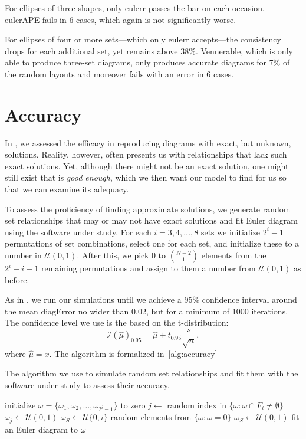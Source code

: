 \documentclass[
  oneside,
  openany,
  numbers=noendperiod,
  parskip=half,
  bibliography=totoc
]{scrbook}\usepackage[]{graphicx}\usepackage{xcolor}
\newcommand{\pkg}[1]{{\fontseries{b}\selectfont #1}}
\begin{document}
For ellipses of three shapes, only \pkg{eulerr} passes the bar on each
occasion. \pkg{eulerAPE} fails in
6
cases, which again is not significantly worse.

For ellipses of four or more sets---which only \pkg{eulerr} accepts---the
consistency drops for each additional set, yet remains above
38\%. \pkg{Vennerable}, which
is only able to produce three-set diagrams, only produces accurate diagrams for
7\% of the random layouts and moreover
fails with an error in 6 cases.

\section{Accuracy}
\label{sec:accuracy}

In , we assessed the efficacy in reproducing diagrams
with exact, but unknown, solutions. Reality, however, often presents us with
relationships that lack such exact solutions. Yet, although there might not be an
exact solution, one might still exist that is \emph{good enough},
which we then want our model to find for us so that we can examine
its adequacy.

To assess the proficiency of finding approximate solutions,
we generate random set relationships that may or may not have
exact solutions and fit Euler diagram using the software under study. For each
$i=3,4,\dots,8$ sets we initialize $2^i-1$ permutations of set combinations,
select one for each set, and initialize these to a number in
$\mathcal{U}(0, 1)$. After this, we pick $0 \text{ to } \binom{N-2}{1}$ elements
from the $2^i-i-1$ remaining permutations and assign to them a number from
$\mathcal{U}(0, 1)$ as before.

As in , we run our simulations until we achieve
a 95\% confidence interval around the mean diagError no wider than 0.02,
but for a minimum of 1000 iterations. The confidence level we use is the
based on the t-distribution:
\begin{equation}
\mathcal{I}(\hat{\mu})_{0.95} = \hat{\mu} \pm t_{0.95}\frac{s}{\sqrt{n}},
\end{equation}
where $\hat{\mu} = \bar{x}$. The algorithm is formalized in~\autoref{alg:accuracy}

\begin{algorithm}
\caption{The algorithm we use to simulate random set relationships and fit
them with the software under study to assess their accuracy.}
\label{alg:accuracy}
\begin{algorithmic}
    \State initialize $\omega = \{\omega_1,\omega_2,\dots,\omega_{2^i-1} \}$ to zero
      \State $j \gets$ random index in $\{\omega : \omega \cap F_i \neq \emptyset\}$
      \State $\omega_j \gets \mathcal{U}(0, 1)$
    \EndFor
    \State $\omega_S \gets \mathcal{U}\{0, i\}$ random elements from $\{\omega : \omega = 0\}$
    \State $\omega_S \gets \mathcal{U}(0, 1)$
    \State fit an Euler diagram to $\omega$
  \EndWhile
\EndFor
\end{algorithmic}
\end{algorithm}
\end{document}
